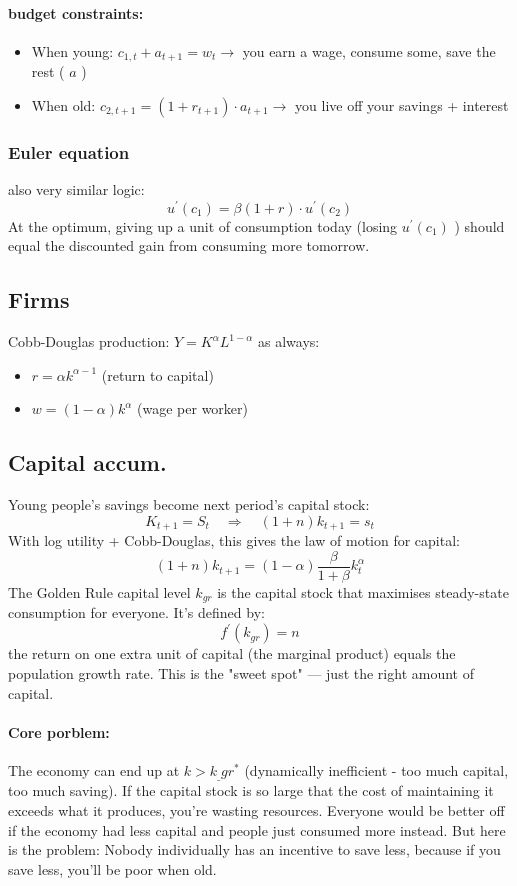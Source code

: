\documentclass[12pt]{article}
\begin{document}
\paragraph{budget constraints:}
\begin{itemize}
    \item When young: $c_{1, t}+a_{t+1}=w_t \rightarrow$ you earn a wage, consume some, save the rest ( $a$ )
    \item When old: $c_{2, t+1}=\left(1+r_{t+1}\right) \cdot a_{t+1} \rightarrow$ you live off your savings + interest
\end{itemize}
\subsubsection{Euler equation}
also very similar logic: 
$$
u^{\prime}\left(c_1\right)=\beta(1+r) \cdot u^{\prime}\left(c_2\right)
$$
At the optimum, giving up a unit of consumption today (losing $u^{\prime}\left(c_1\right)$ ) should equal the discounted gain from consuming more tomorrow.
\subsection{Firms}
Cobb-Douglas production: $Y=K^\alpha L^{1-\alpha}$
as always:
\begin{itemize}
    \item $r=\alpha k^{\alpha-1}$ (return to capital)
    \item $w=(1-\alpha) k^\alpha$ (wage per worker)
\end{itemize}

\subsection{Capital accum.}
Young people's savings become next period's capital stock:
$$
K_{t+1}=S_t \quad \Rightarrow \quad(1+n) k_{t+1}=s_t
$$
With log utility + Cobb-Douglas, this gives the law of motion for capital:
$$
(1+n) k_{t+1}=(1-\alpha) \frac{\beta}{1+\beta} k_t^\alpha
$$
The Golden Rule capital level $k_{g r}$ is the capital stock that maximises steady-state consumption for everyone. It's defined by:
$$
f^{\prime}\left(k_{g r}\right)=n
$$
the return on one extra unit of capital (the marginal product) equals the population growth rate. This is the "sweet spot" — just the right amount of capital.
\paragraph{Core porblem:}
The economy can end up at $k>k_{\_} g r^*$ (dynamically inefficient - too much capital, too much saving). If the capital stock is so large that the cost of maintaining it exceeds what it produces, you're wasting resources. Everyone would be better off if the economy had less capital and people just consumed more instead. But here is the problem: Nobody individually has an incentive to save less, because if you save less, you'll be poor when old.
\end{document}
